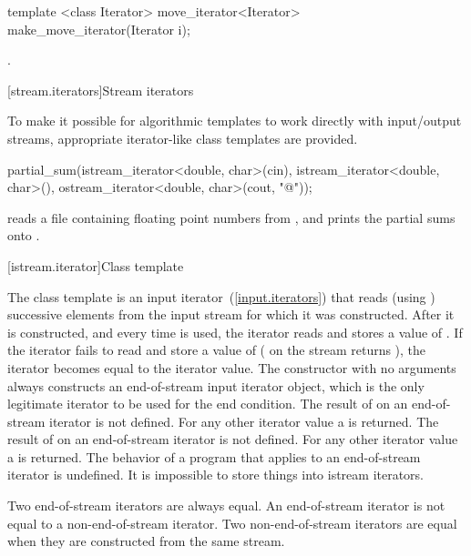 %
\begin{itemdecl}
template <class Iterator>
move_iterator<Iterator> make_move_iterator(Iterator i);
\end{itemdecl}

\begin{itemdescr}
\pnum
\returns {}.
\end{itemdescr}

[stream.iterators]{Stream iterators}

\pnum
To make it possible for algorithmic templates to work directly with input/output streams, appropriate
iterator-like
class templates
are provided.

\enterexample
\begin{codeblock}
partial_sum(istream_iterator<double, char>(cin),
  istream_iterator<double, char>(),
  ostream_iterator<double, char>(cout, "@\textbackslash@n"));
\end{codeblock}

reads a file containing floating point numbers from
,
and prints the partial sums onto
.
\exitexample

[istream.iterator]{Class template }

\pnum
{}%
The class template
is an input iterator~(\ref{input.iterators}) that
reads (using
)
successive elements from the input stream for which it was constructed.
After it is constructed, and every time
\tcode{++}
is used, the iterator reads and stores a value of
.
If the iterator fails to read and store a value of 
(
on the stream returns
),
the iterator becomes equal to the
iterator value.
The constructor with no arguments
always constructs
an end-of-stream input iterator object, which is the only legitimate iterator to be used
for the end condition.
The result of
on an end-of-stream iterator is not defined.
For any other iterator value a
is returned.
The result of
on an end-of-stream iterator is not defined.
For any other iterator value a
is returned.
The behavior of a program that applies  to an end-of-stream
iterator is undefined.
It is impossible to store things into istream iterators.

\pnum
Two end-of-stream iterators are always equal.
An end-of-stream iterator is not
equal to a non-end-of-stream iterator.
Two non-end-of-stream iterators are equal when they are constructed from the same stream.

